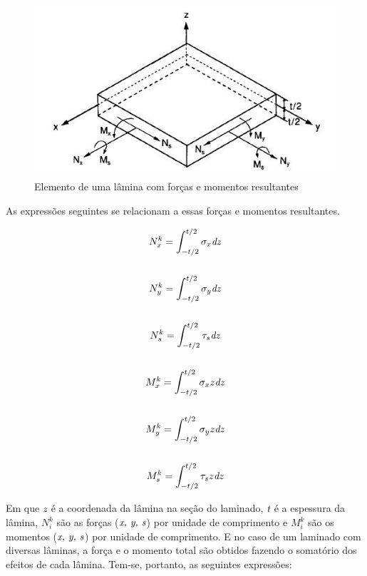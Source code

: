 \begin{figure}[h]
	\caption{\label{fig_laminateforces}Elemento de uma lâmina com forças e momentos resultantes}
  \centering
  \includegraphics[scale=1.0]{figura/LaminateForcesMoments}
\end{figure}

As expressões seguintes se relacionam a essas forças e momentos resultantes.

\begin{equation} \label{ForcesMoments}
\begin{gathered}
N^k_{x}=\int^{t/2}_{-t/2}\sigma_x\emph{dz}\\~\\
N^k_{y}=\int^{t/2}_{-t/2}\sigma_y\emph{dz}\\~\\
N^k_{s}=\int^{t/2}_{-t/2}\tau_s\emph{dz}\\~\\
M^k_{x}=\int^{t/2}_{-t/2}\sigma_x z\emph{dz}\\~\\
M^k_{y}=\int^{t/2}_{-t/2}\sigma_y z\emph{dz}\\~\\
M^k_{s}=\int^{t/2}_{-t/2}\tau_s z\emph{dz}
\end{gathered}
\end{equation}

Em que $\emph{z}$ é a coordenada da lâmina na seção do laminado, $\emph{t}$ é a espessura da lâmina, $N^k_i$ são as forças ($\emph{x, y, s}$) por unidade de comprimento e $M^k_i$ são os momentos ($\emph{x, y, s}$) por unidade de comprimento. E no caso de um laminado com diversas lâminas, a força e o momento total são obtidos fazendo o somatório dos efeitos de cada lâmina. Tem-se, portanto, as seguintes expressões:

